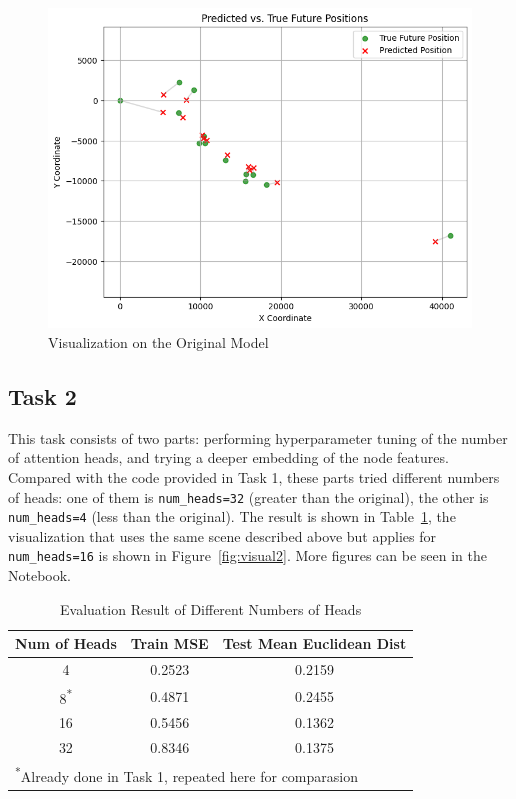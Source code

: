 \documentclass[conference]{IEEEtran}
\begin{document}
\begin{figure}[htbp]
    \centering
    \includegraphics[width=0.8\linewidth]{figvisual1.png}
    \caption{Visualization on the Original Model}
    \label{fig:visual1}
\end{figure}

\subsection*{Task 2}

This task consists of two parts: performing hyperparameter tuning of the number
of attention heads, and trying a deeper embedding of the node features.
Compared with the code provided in Task 1, these parts tried different numbers
of heads: one of them is \texttt{num\_heads=32} (greater than the original), the
other is \texttt{num\_heads=4} (less than the original). The result is shown in
Table~\ref{tab:nh}, the visualization that uses the same scene described above
but applies for \texttt{num\_heads=16} is shown in Figure~\ref{fig:visual2}.
More figures can be seen in the Notebook.

\begin{table}[htbp]
    \caption{Evaluation Result of Different Numbers of Heads}
    \begin{center}
    \begin{tabular}{|c|c|c|}
    \hline
    \textbf{Num of Heads} & \textbf{Train MSE} & \textbf{Test Mean Euclidean Dist} \\
    \hline
    4 & 0.2523 & 0.2159 \\
    \hline
    8\textsuperscript{*} & 0.4871 & 0.2455 \\
    \hline
    16 & 0.5456 & 0.1362 \\
    \hline
    32 & 0.8346 & 0.1375 \\
    \hline

    \multicolumn{3}{l}{\textsuperscript{*}Already done in Task 1, repeated here
        for comparasion}
    \end{tabular}
    \label{tab:nh}
    \end{center}
\end{table}
\end{document}
